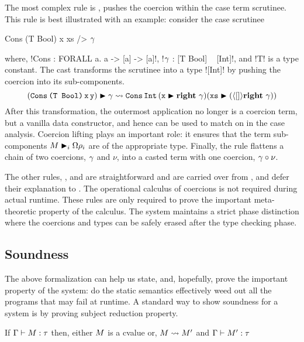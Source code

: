 \documentclass[screen,nonacm,manuscript,review]{acmart} %
\begin{document}
The most complex rule is , pushes the coercion within
the case term scrutinee. This rule is best illustrated with an example: consider
the case scrutinee

\begin{CenteredBox}
\begin{code}
Cons (T Bool) x xs /> $\gamma$
\end{code}
\end{CenteredBox}

where, !Cons : FORALL a. a -> [a] -> [a]!,
!$\gamma$ : [T Bool] ~ [Int]!, and !T! is a type constant.
The cast transforms the scrutinee into a type ![Int]! by pushing
the coercion into its sub-components.
\[
(\texttt{Cons}\, \texttt{(T Bool)}\, \texttt{x}\,
    \texttt{y})\mathrel{\blacktriangleright}\gamma \rightsquigarrow \texttt{Cons} \, \texttt{Int}\,
  (\texttt{x}\mathrel{\blacktriangleright}\textbf{right}~\gamma) (\texttt{xs}\mathrel{\blacktriangleright}(\langle{[]}\rangle\textbf{right}~\gamma))
\]
After this transformation, the outermost application no longer is a
coercion term, but a vanilla data constructor, and hence can be used
to match on in the case analysis.  Coercion lifting plays an important
role: it ensures that the term sub-components $M\mathrel{\blacktriangleright}_i
{\Omega}\rho_i$ are of the appropriate type. Finally, the rule 
flattens a chain of two coercions, $\gamma$ and $\nu$, into a casted term
with one coercion, ${\gamma} \circ {\nu}$.

The other rules, \trule{$\beta$},  and 
are straightforward and are carried over from \SF, and defer their
explanation to \citet{pierce_tapl_2002}. The operational
calculus of coercions is not required during
actual runtime. These rules are only required to prove the important
meta-theoretic property of the calculus. The system maintains a strict
phase distinction where the coercions and types can be safely erased
after the type checking phase.

\subsection{Soundness}
The above formalization can help us state, and, hopefully, prove
the important property of the system: do the static semantics
effectively weed out all the programs that may fail at runtime.
A standard way to show soundness for a system is by proving subject
reduction property\cite{wright_syntactic_1994}.

\begin{prop}\label{prop:sfc-ty-safety}
 If $\Gamma \vdash M : \tau$ then, either $M$ is a cvalue or, $M \rightsquigarrow M'$ and
 $\Gamma \vdash M' : \tau$
\end{prop}
\end{document}
